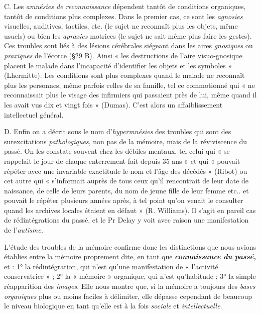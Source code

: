 {{C. Les \textsf{\textit {amnésies de reconnaissance}} dépendent tantôt de conditions organiques,
tantôt de conditions plus complexes. Dans le premier cas, ce sont les
{\it agnosies} visuelles, auditives, tactiles, etc. (le sujet ne reconnaît plus les objets,
même usuels) ou bien les {\it apraxies} motrices (le sujet ne sait même plus faire
les gestes). Ces troubles sont liés à des lésions cérébrales siégeant dans les
aires {\it gnosiques} ou {\it praxiques} de l'écorce (\S 29 B). Ainsi « les destructions
de l’aire visuo-gnosique placent le malade dans l'incapacité d'identifier les
objets et les symboles » (Lhermitte). Les conditions sont plus complexes
quand le malade ne reconnaît plus les personnes, même parfois celles de sa
famille, tel ce commotionné qui « ne reconnaissait plus le visage des infirmiers
qui passaient près de lui, même quand il les avait vus dix et vingt fois »
(Dumas). C’est alors un affaiblissement intellectuel général.

D. Enfin on a décrit sous le nom d’\textsf{\textit {hypermnésies}} des troubles qui sont des
surexcitations {\it pathologiques}, non pas de la mémoire, mais de la réviviscence
du passé. On les constate souvent chez les débiles mentaux, tel celui qui « se
rappelait le jour de chaque enterrement fait depuis 35 ans » et qui « pouvait
répéter avec une invariable exactitude le nom et l’âge des décédés » (Ribot)
ou cet autre qui « s'informait auprès de tous ceux qu’il rencontrait de leur
date de naissance, de celle de leurs parents, du nom de jeune fille de leur
femme etc.. et pouvait le répéter plusieurs années après, à tel point qu'on
venait le consulter quand les archives locales étaient en défaut » (R. Williams).
Il s’agit en pareil cas de rédintégrations du passé, et le Pr Delay
y voit avec raison une manifestation de l'\textsf{\textit {autisme.}}}
\vspace{0.31cm}

L’étude des troubles de la mémoire confirme donc les distinctions
que nous avions établies entre la mémoire proprement dite, en tant
que \textbf{\textit {connaissance du passé,}} et : 1° la rédintégration, qui n’est qu’une
manifestation de « l’activité conservatrice » ; 2° la « mémoire » organique,
qui n’est qu'habitude ; 3° la simple réapparition des {\it images}.
Elle nous montre que, si la mémoire a toujours des {\it bases organiques}
plus ou moins faciles à délimiter, elle dépasse cependant de beaucoup
le niveau biologique en tant qu’elle est à la fois {\it sociale} et {\it intellectuelle}.

\vspace{0.24cm}
{\footnotesize 
}}
